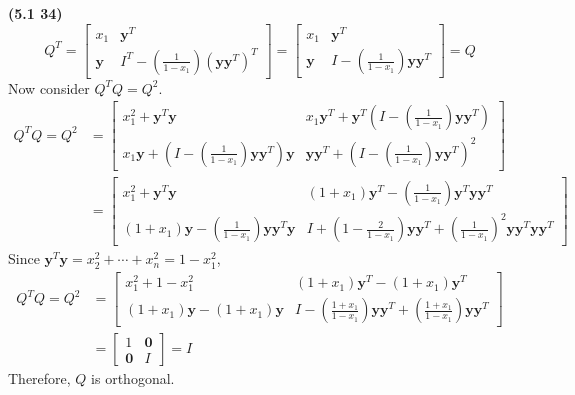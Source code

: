 \textbf{(5.1 34)} \\
\begin{equation*}
	Q^T = \begin{bmatrix}
		x_1 & \textbf{y}^T \\ \textbf{y} & I^T - (\frac{1}{1 - x_1})(\textbf{y}\textbf{y}^T)^T
	\end{bmatrix} = \begin{bmatrix}
		x_1 & \textbf{y}^T \\ \textbf{y} & I - (\frac{1}{1-x_1})\textbf{y}\textbf{y}^T
	\end{bmatrix} = Q
\end{equation*} Now consider $Q^TQ = Q^2$. \begin{align*}
	Q^TQ = Q^2 &= \begin{bmatrix}
		x_1^2 + \textbf{y}^T\textbf{y} & x_1\textbf{y}^T + \textbf{y}^T(I - (\frac{1}{1-x_1})\textbf{y}\textbf{y}^T) \\
		x_1\textbf{y} + (I - (\frac{1}{1-x_1})\textbf{y}\textbf{y}^T)\textbf{y} & \textbf{y}\textbf{y}^T + (I - (\frac{1}{1-x_1})\textbf{y}\textbf{y}^T)^2
	\end{bmatrix} \\
	&= \begin{bmatrix}
		x_1^2 + \textbf{y}^T\textbf{y} & (1+x_1)\textbf{y}^T - (\frac{1}{1-x_1})\textbf{y}^T\textbf{y}\textbf{y}^T \\
		(1+x_1)\textbf{y} - (\frac{1}{1-x_1})\textbf{y}\textbf{y}^T\textbf{y} & I + (1 - \frac{2}{1-x_1})\textbf{y}\textbf{y}^T + (\frac{1}{1-x_1})^2\textbf{y}\textbf{y}^T\textbf{y}\textbf{y}^T
	\end{bmatrix}
\end{align*}
Since $\textbf{y}^T\textbf{y} = x_2^2 + \cdots + x_n^2 = 1 - x_1^2$, \begin{align*}
	Q^TQ = Q^2 &= \begin{bmatrix}
		x_1^2 + 1 - x_1^2 & (1 + x_1)\textbf{y}^T - (1 + x_1)\textbf{y}^T \\
		(1 + x_1)\textbf{y} - (1 + x_1)\textbf{y} & 
		I - (\frac{1+x_1}{1-x_1})\textbf{y}\textbf{y}^T + (\frac{1+x_1}{1-x_1})\textbf{y}\textbf{y}^T
	\end{bmatrix} \\
	&= \begin{bmatrix}
		1 & \textbf{0} \\ \textbf{0} & I
	\end{bmatrix} = I
\end{align*}
Therefore, $Q$ is orthogonal. \\

